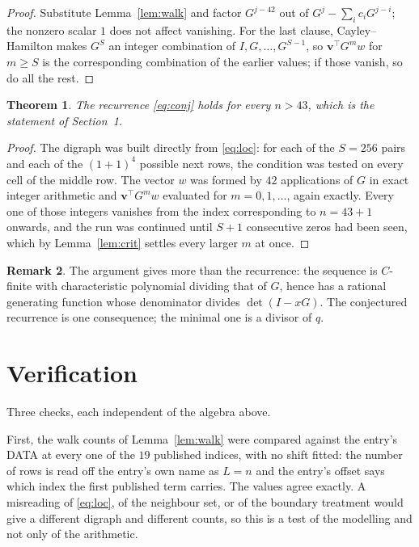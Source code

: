 \documentclass[11pt,a4paper]{article}
\theoremstyle{plain}
\newtheorem{theorem}{Theorem}
\theoremstyle{definition}
\newtheorem{remark}[theorem]{Remark}
\begin{document}
\begin{proof}
Substitute Lemma~\ref{lem:walk} and factor $G^{j-42}$ out of
$G^{j}-\sum_ic_iG^{j-i}$; the nonzero scalar $1$ does not affect
vanishing. For the last clause, Cayley--Hamilton makes $G^{S}$ an integer combination of
$I,G,\dots,G^{S-1}$, so $\mathbf{v}^{\!\top}G^{m}w$ for $m\ge S$ is the corresponding
combination of the earlier values; if those vanish, so do all the rest.
\end{proof}

\begin{theorem}
The recurrence \eqref{eq:conj} holds for every $n>43$, which is the statement of
Section~1.
\end{theorem}

\begin{proof}
The digraph was built directly from \eqref{eq:loc}: for each of the $S=256$ pairs and each
of the $(1+1)^{4}$ possible next rows, the condition was tested on every cell of
the middle row. The vector $w$ was formed by $42$ applications of $G$ in exact integer
arithmetic and $\mathbf{v}^{\!\top}G^{m}w$ evaluated for $m=0,1,\dots$, again exactly.
Every one of those integers vanishes from the index corresponding to $n=43+1$ onwards,
and the run was continued until $S+1$ consecutive zeros had been seen, which by
Lemma~\ref{lem:crit} settles every larger $m$ at once.
\end{proof}

\begin{remark}
The argument gives more than the recurrence: the sequence is $C$-finite with characteristic
polynomial dividing that of $G$, hence has a rational generating function whose denominator
divides $\det(I-xG)$. The conjectured recurrence is one consequence; the minimal one is a
divisor of $q$.
\end{remark}

\section{Verification}

Three checks, each independent of the algebra above.

First, the walk counts of Lemma~\ref{lem:walk} were compared against the entry's DATA at
every one of the $19$ published indices, with no shift fitted: the number of rows is
read off the entry's own name as $L=n$ and the entry's offset says which index the first
published term carries. The values agree exactly. A misreading of \eqref{eq:loc}, of the
neighbour set, or of the boundary treatment would give a different digraph and different
counts, so this is a test of the modelling and not only of the arithmetic.
\end{document}
